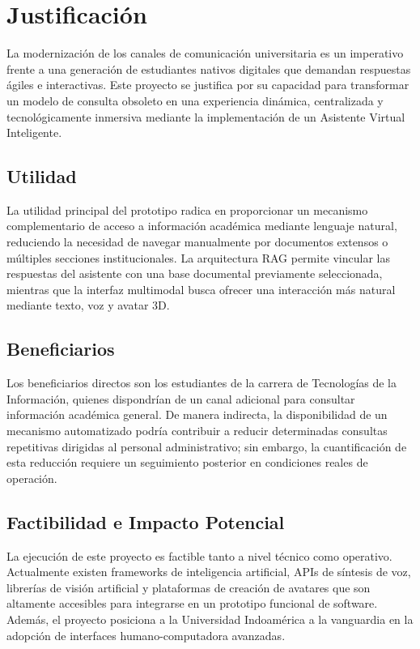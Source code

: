 \section{Justificación}
La modernización de los canales de comunicación universitaria es un imperativo frente a una generación de estudiantes nativos digitales que demandan respuestas ágiles e interactivas. Este proyecto se justifica por su capacidad para transformar un modelo de consulta obsoleto en una experiencia dinámica, centralizada y tecnológicamente inmersiva mediante la implementación de un Asistente Virtual Inteligente.

\subsection{Utilidad}
La utilidad principal del prototipo radica en proporcionar un mecanismo complementario de acceso a información académica mediante lenguaje natural, reduciendo la necesidad de navegar manualmente por documentos extensos o múltiples secciones institucionales. La arquitectura RAG permite vincular las respuestas del asistente con una base documental previamente seleccionada, mientras que la interfaz multimodal busca ofrecer una interacción más natural mediante texto, voz y avatar 3D.

\subsection{Beneficiarios}
Los beneficiarios directos son los estudiantes de la carrera de Tecnologías de la Información, quienes dispondrían de un canal adicional para consultar información académica general. De manera indirecta, la disponibilidad de un mecanismo automatizado podría contribuir a reducir determinadas consultas repetitivas dirigidas al personal administrativo; sin embargo, la cuantificación de esta reducción requiere un seguimiento posterior en condiciones reales de operación.

\subsection{Factibilidad e Impacto Potencial}
La ejecución de este proyecto es factible tanto a nivel técnico como operativo. Actualmente existen frameworks de inteligencia artificial, APIs de síntesis de voz, librerías de visión artificial y plataformas de creación de avatares que son altamente accesibles para integrarse en un prototipo funcional de software. Además, el proyecto posiciona a la Universidad Indoamérica a la vanguardia en la adopción de interfaces humano-computadora avanzadas.

